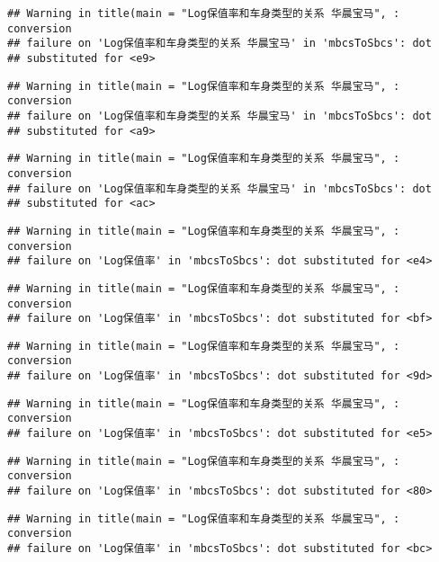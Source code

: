 \documentclass[]{article}
\begin{document}
\begin{verbatim}
## Warning in title(main = "Log保值率和车身类型的关系 华晨宝马", : conversion
## failure on 'Log保值率和车身类型的关系 华晨宝马' in 'mbcsToSbcs': dot
## substituted for <e9>
\end{verbatim}

\begin{verbatim}
## Warning in title(main = "Log保值率和车身类型的关系 华晨宝马", : conversion
## failure on 'Log保值率和车身类型的关系 华晨宝马' in 'mbcsToSbcs': dot
## substituted for <a9>
\end{verbatim}

\begin{verbatim}
## Warning in title(main = "Log保值率和车身类型的关系 华晨宝马", : conversion
## failure on 'Log保值率和车身类型的关系 华晨宝马' in 'mbcsToSbcs': dot
## substituted for <ac>
\end{verbatim}

\begin{verbatim}
## Warning in title(main = "Log保值率和车身类型的关系 华晨宝马", : conversion
## failure on 'Log保值率' in 'mbcsToSbcs': dot substituted for <e4>
\end{verbatim}

\begin{verbatim}
## Warning in title(main = "Log保值率和车身类型的关系 华晨宝马", : conversion
## failure on 'Log保值率' in 'mbcsToSbcs': dot substituted for <bf>
\end{verbatim}

\begin{verbatim}
## Warning in title(main = "Log保值率和车身类型的关系 华晨宝马", : conversion
## failure on 'Log保值率' in 'mbcsToSbcs': dot substituted for <9d>
\end{verbatim}

\begin{verbatim}
## Warning in title(main = "Log保值率和车身类型的关系 华晨宝马", : conversion
## failure on 'Log保值率' in 'mbcsToSbcs': dot substituted for <e5>
\end{verbatim}

\begin{verbatim}
## Warning in title(main = "Log保值率和车身类型的关系 华晨宝马", : conversion
## failure on 'Log保值率' in 'mbcsToSbcs': dot substituted for <80>
\end{verbatim}

\begin{verbatim}
## Warning in title(main = "Log保值率和车身类型的关系 华晨宝马", : conversion
## failure on 'Log保值率' in 'mbcsToSbcs': dot substituted for <bc>
\end{verbatim}
\end{document}
